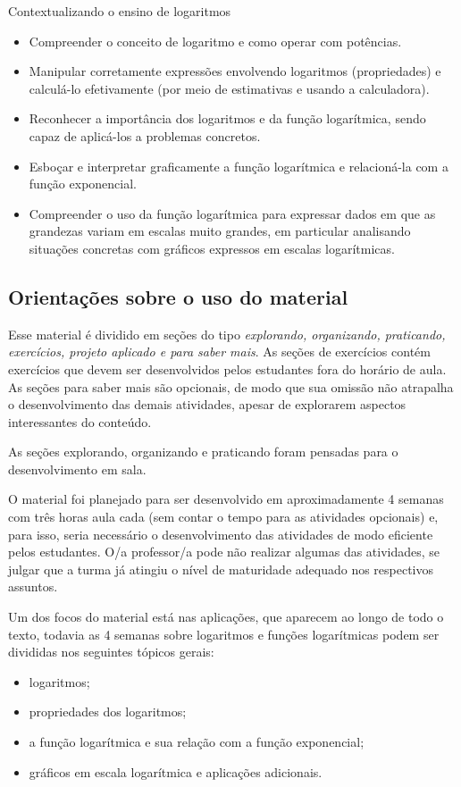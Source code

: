 \begin{apresentacao}{Contextualizando o ensino de logaritmos}
\begin{itemize}
\item  Compreender o conceito de logaritmo e como operar com potências.
\item Manipular corretamente expressões envolvendo logaritmos (propriedades) e calculá-lo efetivamente
(por meio de estimativas e usando a calculadora).
\item Reconhecer a importância dos logaritmos e da função logarítmica, sendo capaz de
aplicá-los a problemas concretos.
\item Esboçar e interpretar graficamente a função logarítmica e relacioná-la com a função
exponencial.
\item Compreender o uso da função logarítmica para expressar dados em que as grandezas
variam em escalas muito grandes, em particular analisando situações concretas com
gráficos expressos em escalas logarítmicas.
\end{itemize}

\subsection*{Orientações sobre o uso do material}

Esse material é dividido em seções do tipo \textit{explorando, organizando, praticando, exercícios, projeto aplicado e para saber mais}. As seções de exercícios contém exercícios que devem ser desenvolvidos pelos estudantes fora do horário de aula. As seções para saber mais são opcionais, de modo que sua omissão não atrapalha o desenvolvimento das demais atividades, apesar de explorarem aspectos interessantes do conteúdo.

As seções explorando, organizando e praticando foram pensadas para o desenvolvimento em sala.

O material foi planejado para ser desenvolvido em aproximadamente 4 semanas com três horas aula cada (sem contar o tempo para as atividades opcionais) e, para isso, seria necessário o desenvolvimento das atividades de modo eficiente pelos estudantes. O/a professor/a pode não realizar algumas das atividades, se julgar que a turma já atingiu o nível de maturidade adequado nos respectivos assuntos.

Um dos focos do material está nas aplicações, que aparecem ao longo de todo o texto, todavia as 4 semanas sobre logaritmos e funções logarítmicas podem ser divididas nos seguintes tópicos gerais:
\begin{itemize}
\item logaritmos;
\item propriedades dos logaritmos;
\item a função logarítmica e sua relação com a função exponencial;
\item gráficos em escala logarítmica e aplicações adicionais.
\end{itemize}


\end{apresentacao}

